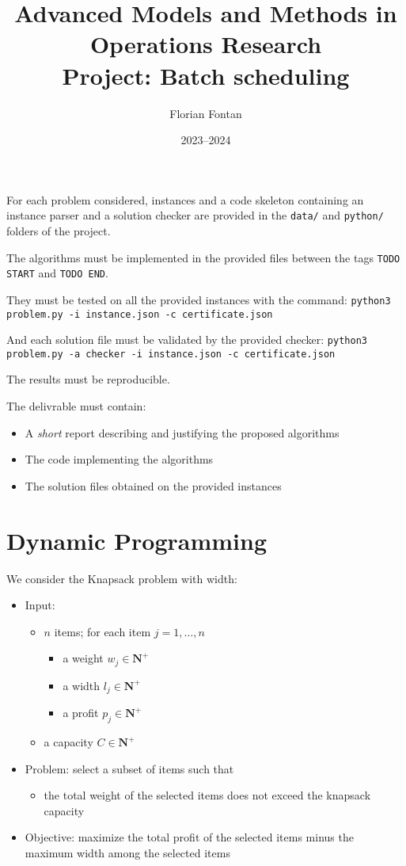 \documentclass[a4paper,twocolumn]{article}
\author{Florian Fontan}
\title{Advanced Models and Methods in Operations Research \\ Project: Batch scheduling}
\date{2023--2024}
\newcommand{\N}{\mathbf{N}}
\begin{document}
\maketitle

For each problem considered, instances and a code skeleton containing an instance parser and a solution checker are provided in the \texttt{data/} and \texttt{python/} folders of the project.

The algorithms must be implemented in the provided files between the tags \texttt{TODO START} and \texttt{TODO END}.

They must be tested on all the provided instances with the command:
\texttt{python3 problem.py -i instance.json -c certificate.json}

And each solution file must be validated by the provided checker:
\texttt{python3 problem.py -a checker -i instance.json -c certificate.json}

The results must be reproducible.

\bigskip

The delivrable must contain:
\begin{itemize}
  \item A \emph{short} report describing and justifying the proposed algorithms
  \item The code implementing the algorithms
  \item The solution files obtained on the provided instances
\end{itemize}

\section{Dynamic Programming}

We consider the Knapsack problem with width:
\begin{itemize}
  \item Input:
    \begin{itemize}
      \item $n$ items; for each item $j = 1, \dots, n$
        \begin{itemize}
          \item a weight $w_j \in \N^+$
          \item a width $l_j \in \N^+$
          \item a profit $p_j \in \N^+$
        \end{itemize}
      \item a capacity $C \in \N^+$
    \end{itemize}
  \item Problem: select a subset of items such that
    \begin{itemize}
      \item the total weight of the selected items does not exceed the knapsack capacity
    \end{itemize}
  \item Objective: maximize the total profit of the selected items minus the maximum width among the selected items
\end{itemize}
\end{document}
